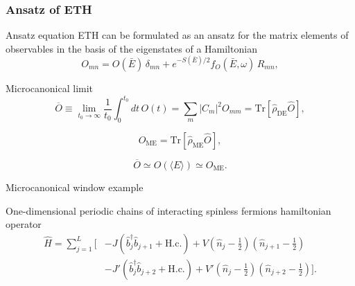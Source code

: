 
\begin{frame}
\frametitle{Ansatz of ETH}

\begin{block}{Ansatz equation}
ETH can be formulated as an ansatz for the matrix elements of observables in the basis
of the eigenstates of a Hamiltonian 
\begin{equation}
O_{mn} = O(\bar{E})\,\delta_{mn} + e^{-S(\bar{E})/2} f_{O}(\bar{E}, \omega)\, R_{mn},
\end{equation}

\end{block}

\begin{block}{Microcanonical limit}
\begin{equation}
\overline{O} \equiv \lim_{t_0 \to \infty} \frac{1}{t_0} \int_{0}^{t_0} dt\, O(t)
= \sum_m |C_m|^2 O_{mm} = \mathrm{Tr}\!\left[\hat{\rho}_{\mathrm{DE}} \hat{O}\right],
\end{equation}

\begin{equation}
O_{\mathrm{ME}} = \mathrm{Tr}\!\left[\hat{\rho}_{\mathrm{ME}} \hat{O}\right],
\end{equation}

\begin{equation}
\overline{O} \simeq O(\langle E \rangle) \simeq O_{\mathrm{ME}}.
\end{equation}

\end{block}
\end{frame}

\begin{frame}{Microcanonical window example}
\begin{block}{One-dimensional periodic chains of interacting spinless fermions hamiltonian operator}
\begin{equation}
\begin{split}
\hat{H} = \sum_{j=1}^{L} \Bigg[
    &-J \left( \hat{b}_j^{\dagger} \hat{b}_{j+1} + \text{H.c.} \right)
    + V \left( \hat{n}_j - \frac{1}{2} \right)
      \left( \hat{n}_{j+1} - \frac{1}{2} \right) \\
    &- J' \left( \hat{b}_j^{\dagger} \hat{b}_{j+2} + \text{H.c.} \right)
    + V' \left( \hat{n}_j - \frac{1}{2} \right)
      \left( \hat{n}_{j+2} - \frac{1}{2} \right)
\Bigg].
\end{split}
\end{equation}
\end{block}
\end{frame}

